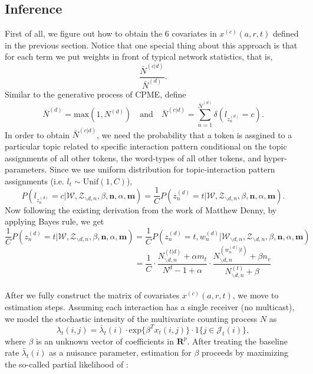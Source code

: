 \documentclass[a4paper]{article}
\begin{document}
\subsection{Inference}
First of all, we figure out how to obtain the 6 covariates in $x^{(c)}(a, r, t)$ defined in the previous section. Notice that one special thing about this approach is that for each term we put weights in front of typical network statistics, that is, $$\frac{\bar N^{(c|d)}}{\bar N^{(d)}}.$$
Similar to the generative process of CPME, define $$\bar N^{(d)}=\mbox{max}(1, N^{(d)})\quad\mbox{and}\quad \bar N^{(c|d)}=\sum_{n=1}^{\bar N^{(d)}}\delta(l_{z_n^{(d)}}=c).$$
In order to obtain $\bar N^{(c|d)}$, we need the probability that a token is assgined to a particular topic related to specific interaction pattern conditional on the topic assignments of all other tokens, the word-types of all other tokens, and hyper-parameters. Since we use uniform distribution for topic-interaction pattern assignments (i.e. $l_t \sim \mbox{Unif}(1, C)$), 
$$P(l_{z_n^{(d)}}=c|\mathcal{W}, \mathcal{Z}_{\backslash d, n}, \beta, \boldsymbol{n}, \alpha, \boldsymbol{m})=\frac{1}{C}P({z_n^{(d)}}=t | \mathcal{W}, \mathcal{Z}_{\backslash d, n}, \beta, \boldsymbol{n}, \alpha, \boldsymbol{m}).$$ 
Now following the existing derivation from the work of Matthew Denny, by applying Bayes rule, we get $$\frac{1}{C}P({z_n^{(d)}}=t | \mathcal{W}, \mathcal{Z}_{\backslash d, n}, \beta, \boldsymbol{n}, \alpha, \boldsymbol{m})=\frac{1}{C}P({z_n^{(d)}}=t, w_n^{(d)} | \mathcal{W}_{\backslash d, n}, \mathcal{Z}_{\backslash d, n}, \beta, \boldsymbol{n}, \alpha, \boldsymbol{m})$$
$$\quad\quad\quad\quad\quad\quad\quad\quad\quad\quad\quad\quad=\frac{1}{C}\cdot \frac{N_{\backslash d, n}^{(t|d)}+\alpha m_t}{N^{d}-1+\alpha}\cdot \frac{N_{\backslash d, n}^{(w_n^{(d)}|t)}+\beta n_v}{N_{\backslash d, n}^{(t)}+\beta} $$\\\newline
After we fully construct the matrix of covariates $x^{(c)}(a, r, t)$, we move to estimation steps. Assuming each interaction has a single receiver (no multicast), we model the stochastic intensity of the multivariate counting process $N$ as \begin{equation}\lambda_t(i,j)=\bar\lambda_t(i)\cdot \mbox{exp}\{\beta^Tx_t(i, j)\}\cdot 1\{j \in \mathcal{J}_t(i)\},
\end{equation} 
where $\beta$ is an unknown vector of coefficients in $\boldsymbol{R}^{p}$. After treating the baseline rate $\bar\lambda_t(i)$ as a nuisance parameter, estimation for $\beta$ proceeds by maximizing the so-called partial likelihood of \cite{cox1992regression}: 
\end{document}
